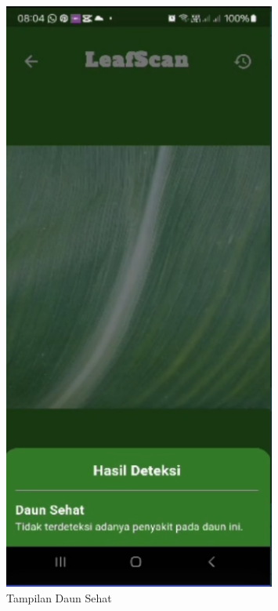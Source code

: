 \documentclass[journal,article,submit,pdftex,moreauthors]{Definitions/mdpi}
\begin{document}
\begin{itemize}
\begin{itemize}
\begin{figure}[H]
\begin{minipage}{0.3\textwidth}
                \includegraphics[width=0.8\textwidth]{Images/daun_sehat.png}
                \caption{\centering Tampilan Daun Sehat}
                \label{fig:register-view}
            \end{minipage}
        \end{figure}
        

\end{itemize}
\end{itemize}
\end{document}
